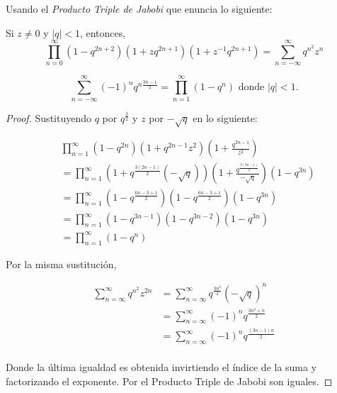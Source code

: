 \documentclass[12pt,letterpaper]{article}
\begin{document}
Usando el \textit{Producto Triple de Jabobi} que enuncia lo siguiente:
\begin{theorem}
    Si $z \not= 0$ y $|q| < 1$, entonces,
    \[ \prod_{n=0}^{\infty} (1-q^{2n+2})(1 +zq^{2n+1})(1+z^{-1}q^{2n+1}) =
        \sum_{n=-\infty}^{\infty} q^{n^2}z^n\]
\end{theorem}

\begin{theorem}
\[ \sum_{n=-\infty}^{\infty} (-1)^{n} q^{n\frac{3n-1}{2}} =
    \prod_{n=1}^{\infty} (1-q^n) \text{ donde $|q|<1$.} \]
\begin{proof}
Sustituyendo $q$ por $q^{\frac{3}{2}}$ y $z$ por $-\sqrt{q}$ en lo siguiente:

\begin{align*}
    &\prod_{n=1}^{\infty} (1-q^{2n})(1+q^{2n-1}z^2) \left(1+\frac{q^{2n-1}}{z^2} \right)\\
        &= \prod_{n=1}^{\infty} (1 + q^{\frac{3(2n-1)}{2}}(-\sqrt{q}))
            \left(1+\frac{q^{\frac{3(2n-1)}{2}}}{-\sqrt{q}} \right) (1-q^{3n})\\
        &= \prod_{n=1}^{\infty}(1-q^{\frac{6n-3+1}{2}})
            (1-q^{\frac{6n-3+1}{2}})(1-q^{3n})\\
        &= \prod_{n=1}^{\infty}(1-q^{3n-1})(1-q^{3n-2})(1-q^{3n})\\
        &= \prod_{n=1}^{\infty}(1-q^n)
\end{align*}

Por la misma sustitución,

\begin{align*}
    \sum_{n=\infty}^{\infty} q^{n^2}z^{2n}
        &= \sum_{n=\infty}^{\infty} q^{\frac{3n^2}{2}} (-\sqrt{q})^n\\
        &= \sum_{n=\infty}^{\infty} (-1)^n q^{\frac{3n^2 + n}{2}}\\
        &= \sum_{n=\infty}^{\infty} (-1)^n q^{\frac{(3n - 1)n}{2}}\\
\end{align*}

Donde la última igualdad es obtenida invirtiendo el índice de la suma y factorizando el exponente. Por el
Producto Triple de Jabobi son iguales.
\end{proof}

\end{theorem}





\end{document}
